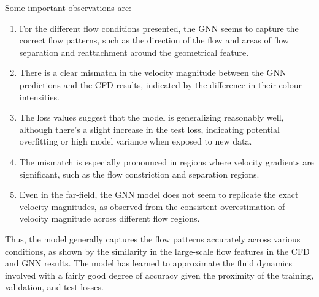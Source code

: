 Some important observations are: 
\begin{enumerate}
    \item For the different flow conditions presented, the GNN seems to capture the correct flow patterns, such as the direction of the flow and areas of flow separation and reattachment around the geometrical feature.
    \item  There is a clear mismatch in the velocity magnitude between the GNN predictions and the CFD results, indicated by the difference in their colour intensities.
    \item  The loss values suggest that the model is generalizing reasonably well, although there's a slight increase in the test loss, indicating potential overfitting or high model variance when exposed to new data.
    \item The mismatch is especially pronounced in regions where velocity gradients are significant, such as the flow constriction and separation regions. 
    \item Even in the far-field, the GNN model does not seem to replicate the exact velocity magnitudes, as observed from the consistent overestimation of velocity magnitude across different flow regions.
\end{enumerate}
Thus, the model generally captures the flow patterns accurately across various conditions, as shown by the similarity in the large-scale flow features in the CFD and GNN results. The model has learned to approximate the fluid dynamics involved with a fairly good degree of accuracy given the proximity of the training, validation, and test losses. 
